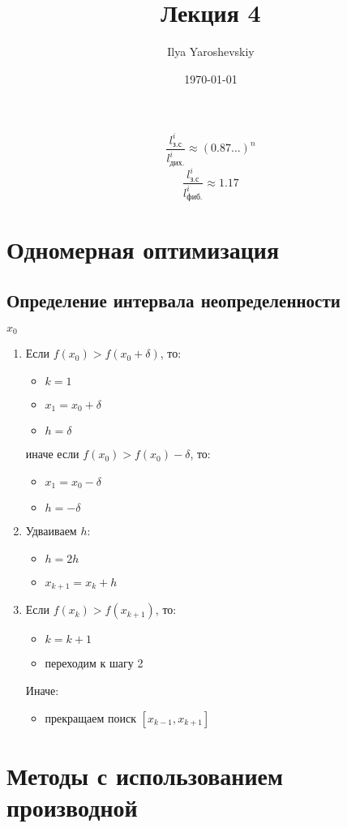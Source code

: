 \documentclass[english]{article}
\author{Ilya Yaroshevskiy}
\date{\today}
\title{Лекция 4}
\theoremstyle{plain}
\theoremstyle{remark}
\theoremstyle{definition}
\begin{document}
\maketitle
\tableofcontents

\[ \frac{l_\text{з.с}^i}{l_\text{дих.}^i} \approx (0.87\dots)^n \] \[
\frac{l_\text{з.с}^i}{l_\text{фиб.}^i} \approx 1.17 \]

\section{Одномерная оптимизация}
\label{sec:orgda7c496}
\subsection{Определение интервала неопределенности}
\label{sec:org70de6d7}
\(x_0\)
\begin{enumerate}
\item Если \(f(x_0) > f(x_0 + \delta)\), то:
\begin{itemize}
\item \(k = 1\)
\item \(x_1 = x_0 + \delta\)
\item \(h = \delta\)
\end{itemize}
иначе если \(f(x_0) > f(x_0) - \delta\), то:
\begin{itemize}
\item \(x_1 = x_0 - \delta\)
\item \(h = -\delta\)
\end{itemize}
\item Удваиваем \(h\):
\begin{itemize}
\item \(h = 2h\)
\item \(x_{k + 1} = x_k + h\)
\end{itemize}
\item Если \(f(x_k) > f(x_{k + 1})\), то:
\begin{itemize}
\item \(k = k + 1\)
\item переходим к шагу 2
\end{itemize}
Иначе:
\begin{itemize}
\item прекращаем поиск \([x_{k - 1}, x_{k + 1}]\)
\end{itemize}
\end{enumerate}
\section{Методы с использованием производной}
\label{sec:orge9a565a}
\end{document}
